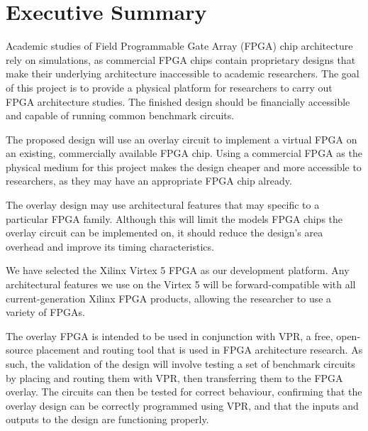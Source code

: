\thispagestyle{empty}
\section*{Executive Summary}


Academic studies of Field Programmable Gate Array (FPGA) chip architecture rely on simulations, as commercial FPGA chips contain proprietary designs that make their underlying architecture inaccessible to academic researchers.
The goal of this project is to provide a physical platform for researchers to carry out FPGA architecture studies.
The finished design should be financially accessible and capable of running common benchmark circuits.

The proposed design will use an overlay circuit to implement a virtual FPGA on an existing, commercially available FPGA chip.
Using a commercial FPGA as the physical medium for this project makes the design cheaper and more accessible to researchers, as they may have an appropriate FPGA chip already.

The overlay design may use architectural features that may specific to a particular FPGA family.
Although this will limit the models FPGA chips the overlay circuit can be implemented on, it should reduce the design's area overhead and improve its timing characteristics.

We have selected the Xilinx Virtex 5 FPGA as our development platform.
Any architectural features we use on the Virtex 5 will be forward-compatible with all current-generation Xilinx FPGA products, allowing the researcher to use a variety of FPGAs.

The overlay FPGA is intended to be used in conjunction with VPR, a free, open-source placement and routing tool that is used in FPGA architecture research.
As such, the validation of the design will involve testing a set of benchmark circuits by placing and routing them with VPR, then transferring them to the FPGA overlay.
The circuits can then be tested for correct behaviour, confirming that the overlay design can be correctly programmed using VPR, and that the inputs and outputs to the design are functioning properly.

